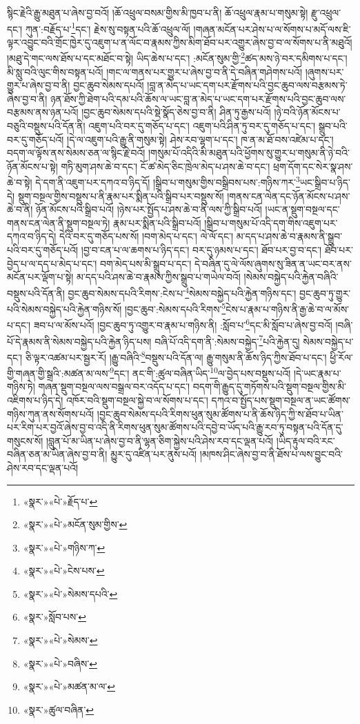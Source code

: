 སྙིང་རྗེའི་རྒྱུ་མཐུན་པ་ཞེས་བྱ་བའོ། །ཆོ་འཕྲུལ་བསམ་གྱིས་མི་ཁྱབ་པ་ནི། ཆོ་འཕྲུལ་རྣམ་པ་གསུམ་སྟེ། རྫུ་འཕྲུལ་དང་། ཀུན་:བརྗོད་པ་\footnote{«སྣར་»«པེ་»རྗོད་པ་}དང་། རྗེས་སུ་བསྟན་པའི་ཆོ་འཕྲུལ་ལོ། །གཞན་མངོན་པར་ཤེས་པ་ལ་སོགས་པ་མདོ་ལས་ཇི་ལྟར་འབྱུང་བའི་གྲོང་ཁྱེར་དུ་འཇུག་པ་ན་ལོང་བ་རྣམས་ཀྱིས་མིག་ཐོབ་པར་འགྱུར་ཞེས་བྱ་བ་ལ་སོགས་པ་ནི་མཐུའོ། །མཐུ་དེ་གང་ལས་ཐོས་པ་དང་མཐོང་བ་སྟེ། ཡིད་ཆེས་པ་དང་། :མངོན་སུམ་གྱི་\footnote{«སྣར་»«པེ་»མངོན་སུམ་གྱིས་}ཚད་མས་ཉེ་བར་དམིགས་པ་དང་། མི་སླུ་བའི་ལུང་གིས་བསྟན་པའོ། །གང་ལ་གནས་པར་གྱུར་པ་ཞེས་བྱ་བ་ནི་དེ་བཞིན་གཤེགས་པའོ། །ཞུགས་པར་གྱུར་པ་ཞེས་བྱ་བ་ནི། བྱང་ཆུབ་སེམས་དཔའོ། །བླ་ན་མེད་པ་ཡང་དག་པར་རྫོགས་པའི་བྱང་ཆུབ་ལས་བརྩམས་ཏེ་ཞེས་བྱ་བ་ནི། ཉན་ཐོས་ཀྱི་ཐེག་པའི་དམ་པའི་ཆོས་ལ་ཡང་བླ་ན་མེད་པ་ཡང་དག་པར་རྫོགས་པའི་བྱང་ཆུབ་ལས་བརྩམས་ནས་ཉན་པའོ། །བྱང་ཆུབ་སེམས་དཔའི་སྡེ་སྣོད་ཅེས་བྱ་བ་ནི། ཤིན་ཏུ་རྒྱས་པའོ། །ཉེ་བའི་ཉོན་མོངས་པ་བཅུའི་བསྡུས་པའི་དོན་ནི། འཇུག་པའི་བར་དུ་གཅོད་པ་དང་། འཇུག་པའི་ཤིན་ཏུ་བར་དུ་གཅོད་པ་དང་། སྒྲུབ་པའི་བར་དུ་གཅོད་པའོ། །དེ་ལ་འཇུག་པའི་རྒྱུ་ནི་གསུམ་སྟེ། ཤེས་རབ་ལྷག་པ་དང་། ཁ་ན་མ་ཐོ་བས་འཛེམ་པ་དང་། བདག་ལ་ལྟོས་ནས་སེམས་ཅན་ལ་སྙིང་རྗེ་བའོ། །གསུམ་པོ་འདིའི་མི་མཐུན་པའི་ཕྱོགས་སུ་གྱུར་པ་གསུམ་ནི་ཉེ་བའི་ཉོན་མོངས་པ་སྟེ། གཏི་མུག་ཤས་ཆེ་བ་དང་། ངོ་ཚ་མེད་ཅིང་ཁྲེལ་མེད་པ་ཤས་ཆེ་བ་དང་། ཕྲག་དོག་དང་སེར་སྣ་ཤས་ཆེ་བ་སྟེ། དེ་དག་ནི་འཇུག་པར་དཀའ་བ་ཉིད་དོ། །སྒྲིབ་པ་གསུམ་གྱིས་བསྒྲིབས་པས་:གཉིས་ཀར་\footnote{«སྣར་»«པེ་»གཉིས་ཀ་}ཡང་སྒྲིབ་པ་ཉིད་དེ། སྡུག་བསྔལ་གྱིས་བསྡུས་པ་ནི་རྣམ་པར་སྨིན་པའི་སྒྲིབ་པར་བསྡུས་སོ། །གནས་ངན་ལེན་དང་ཉོན་མོངས་པ་ཤས་ཆེ་བ་ནི། ཉོན་མོངས་པའི་སྒྲིབ་པའོ། །ཉེས་པར་སྤྱོད་པ་ཤས་ཆེ་བ་ནི་ལས་ཀྱི་སྒྲིབ་པའོ། །ཡང་ན་སྡུག་བསྔལ་དང་གནས་ངན་ལེན་ནི་སྡུག་བསྔལ་ཏེ། རྣམ་པར་སྨིན་པའི་སྒྲིབ་པའོ། །སྒྲིབ་པ་གསུམ་པོ་འདི་དག་གིས་འཇུག་པར་དཀའ་བ་ཉིད་དེ། དེའི་བར་དུ་གཅོད་པས་སོ། །བག་མེད་པ་དང་། ལེ་ལོ་དང་། མ་དད་པ་ཤས་ཆེ་བ་རྣམས་ནི་སྒྲུབ་པའི་བར་དུ་གཅོད་པའོ། །བྱ་བ་ངན་པ་ལ་ཆགས་པ་ཉིད་དང་། བར་དུ་ཉམས་པ་དང་། ཐོབ་པར་བྱ་བ་དང་། ཐོབ་པར་བྱེད་པ་ལ་དད་པ་མེད་པ་དང་། བག་མེད་པས་མི་སྒྲུབ་པ་དང་། དེ་བཞིན་དུ་ལེ་ལོས་ཞུགས་སུ་ཟིན་ན་ཡང་བར་ནས་མངོན་པར་ལྡོག་པ་སྟེ། མ་དད་པའི་ཤས་ཆེ་བ་རྣམས་ཀྱིས་སྒྲུབ་པ་གཡེལ་བའོ། །སེམས་བསྐྱེད་པའི་རྐྱེན་བཞིའི་བསྡུས་པའི་དོན་ནི། བྱང་ཆུབ་སེམས་དཔའི་རིགས་:ངེས་པ་\footnote{«སྣར་»«པེ་»ངེས་པས་}སེམས་བསྐྱེད་པའི་རྐྱེན་གཉིས་དང་། བྱང་ཆུབ་ཏུ་གྱུར་པའི་སེམས་བསྐྱེད་པའི་རྐྱེན་གཉིས་སོ། །བྱང་ཆུབ་:སེམས་དཔའི་རིགས་\footnote{«སྣར་»«པེ་»སེམས་དཔའི་}ངེས་པ་རྣམ་པ་གཉིས་ནི་རྒྱ་ཆེ་བ་ལ་མོས་པ་དང་། ཟབ་པ་ལ་མོས་པའོ། །བྱང་ཆུབ་ཏུ་འགྱུར་བ་རྣམ་པ་གཉིས་ནི། :སློབ་པ་\footnote{«སྣར་»སློབ་པས་}དང་མི་སློབ་པ་ཞེས་བྱ་བའོ། །བཞི་པོ་དེ་རྣམས་ནི་སེམས་བསྐྱེད་པའི་རྐྱེན་ཉིད་པས། བཞི་པོ་འདི་དག་ནི་:སེམས་བསྐྱེད་\footnote{«སྣར་»«པེ་»སེམས་}པའི་རྐྱེན་དུ། སེམས་བསྐྱེད་པ་དང་། ཅི་ལྟར་འཚམ་པར་སྦྱར་རོ། །རྒྱུ་བཞིའི་\footnote{«སྣར་»«པེ་»བཞིས་}བསྡུས་པའི་དོན་ལ། རྒྱུ་གསུམ་ནི་ཆོས་ཉིད་ཀྱིས་ཐོབ་པ་དང་། ཕྱི་རོལ་གྱི་གཞན་གྱི་སྒྲའི་:མཚན་མ་ལས་\footnote{«སྣར་»«པེ་»མཚན་མ་ལ་}དང་། ནང་གི་:ཚུལ་བཞིན་ཡིད་\footnote{«སྣར་»ཚུལ་བཞིན་}ལ་བྱེད་པས་བསྡུས་པའོ། །དེ་ཡང་རྣམ་པ་གཉིས་ཏེ། གཞན་སྡུག་བསྔལ་ལས་བསྒྲལ་བར་འདོད་པ་དང་། བདག་གི་རྒྱུད་དུ་གཏོགས་པའི་སྡུག་བསྔལ་གྱིས་མི་འཇིགས་པ་ཉིད་དེ། འཁོར་བའི་སྡུག་བསྔལ་སྐྱེ་བ་ལ་སོགས་པ་དང་། དཀའ་བ་སྤྱོད་པས་སྡུག་བསྔལ་ན་ཡང་ཚོགས་གཉིས་ཀུན་ནས་སོགས་པའོ། །བྱང་ཆུབ་སེམས་དཔའི་རིགས་ཕུན་སུམ་ཚོགས་པ་ནི་ཆོས་ཉིད་ཀྱི་ས་ཐོབ་པ་ཡིན་པར་རིག་པར་བྱའོ་ཞེས་བྱ་བ་འདི་ནི་རིགས་ཕུན་སུམ་ཚོགས་པའི་དབྱེ་བ་ཡོད་པའི་རྒྱུ་རབ་ཏུ་བསྟན་པའི་དོན་དུ་གསུངས་སོ། །བླུན་པོ་མ་ཡིན་པ་ཞེས་བྱ་བ་ནི་ལྷན་ཅིག་སྐྱེས་པའི་ཤེས་རབ་དང་ལྡན་པའོ། །ཡིད་རྟུལ་བའི་རང་བཞིན་ཅན་མ་ཡིན་ཞེས་བྱ་བ་ནི། མྱུར་དུ་འཛིན་པར་ནུས་པའོ། །མཁས་ཤིང་ཞེས་བྱ་བ་ནི་ཐོས་པ་ལས་བྱུང་བའི་ཤེས་རབ་དང་ལྡན་པའོ། 